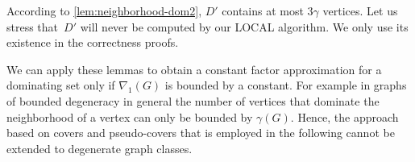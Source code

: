 According to %
\cref{lem:neighborhood-dom2}, $D'$ contains at most
$3\gamma$ vertices.
Let us stress that~$D'$ will never be computed by our LOCAL algorithm. We only use
its existence in the correctness proofs.

\smallskip
We can apply these
lemmas to obtain a constant factor approximation for a dominating
set only if $\nabla_1(G)$ is bounded by a constant. For example in graphs of bounded degeneracy in general the number of vertices that dominate the
neighborhood of a vertex can only be bounded by $\gamma(G)$.
Hence, the approach based on covers and pseudo-covers that is employed
in the following cannot be extended to degenerate  graph classes.

